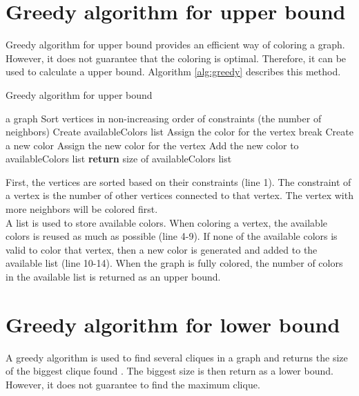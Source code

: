 \documentclass[a4paper]{report}
\begin{document}
		\section{Greedy algorithm for upper bound}
		Greedy algorithm for upper bound provides an efficient way of coloring a graph. However, it does not guarantee that the coloring is optimal. Therefore, it can be used to calculate a upper bound. Algorithm \ref{alg:greedy} \cite{jensen2011graph} describes this method.\\
		\begin{algorithm}
			\caption{Greedy algorithm for upper bound}
			\label{alg:greedy}
			\begin{algorithmic}[1]
				\REQUIRE a graph
				\STATE Sort vertices in non-increasing order of constraints (the number of neighbors)
				\STATE Create availableColors list
					\STATE Assign the color for the vertex
					\STATE break
					\ENDIF
					\ENDFOR
					\STATE Create a new color
					\STATE Assign the new color for the vertex
					\STATE Add the new color to availableColors list
					\ENDIF
				\ENDFOR
				\STATE \textbf{return} size of availableColors list
			\end{algorithmic}
		\end{algorithm}
		First, the vertices are sorted based on their constraints (line 1). The constraint of a vertex is the number of other vertices connected to that vertex. The vertex with more neighbors will be colored first.\\
		A list is used to store available colors. When coloring a vertex, the available colors is reused as much as possible (line 4-9). If none of the available colors is valid to color that vertex, then a new color is generated and added to the available list (line 10-14). When the graph is fully colored, the number of colors in the available list is returned as an upper bound.\\
		
		\section{Greedy algorithm for lower bound}
		A greedy algorithm is used to find several cliques in a graph and returns the size of the biggest clique found \cite{steven2008algorithm}. The biggest size is then return as a lower bound. However, it does not guarantee to find the maximum clique. \\
		
\end{document}
